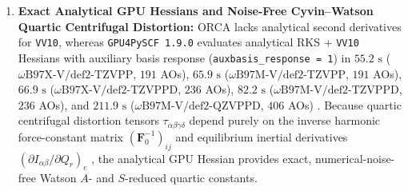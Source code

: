 \documentclass[journal=jpclcd,manuscript=article]{achemso}
\begin{document}
\begin{enumerate}
  \item \textbf{Exact Analytical GPU Hessians and Noise-Free Cyvin--Watson Quartic Centrifugal Distortion:} ORCA lacks analytical second derivatives for \texttt{VV10}, whereas \texttt{GPU4PySCF 1.9.0} evaluates analytical RKS + \texttt{VV10} Hessians with auxiliary basis response (\texttt{auxbasis\_response = 1}) in $55.2\text{ s}$ ($\omega\text{B97X-V/def2-TZVPP}$, $191$ AOs), $65.9\text{ s}$ ($\omega\text{B97M-V/def2-TZVPP}$, $191$ AOs), $66.9\text{ s}$ ($\omega\text{B97X-V/def2-TZVPPD}$, $236$ AOs), $82.2\text{ s}$ ($\omega\text{B97M-V/def2-TZVPPD}$, $236$ AOs), and $211.9\text{ s}$ ($\omega\text{B97M-V/def2-QZVPPD}$, $406$ AOs) \cite{Weigend2005, Rappoport2010}. Because quartic centrifugal distortion tensors $\tau_{\alpha\beta\gamma\delta}$ depend purely on the inverse harmonic force-constant matrix $(\mathbf{F}_0^{-1})_{ij}$ and equilibrium inertial derivatives $(\partial I_{\alpha\beta}/\partial Q_r)_e$ \cite{Cyvin1968, Watson1977}, the analytical GPU Hessian provides exact, numerical-noise-free Watson $A$- and $S$-reduced quartic constants.
\end{enumerate}
\end{document}
